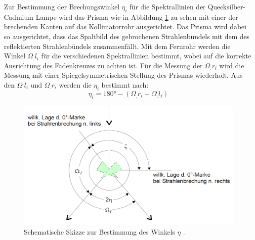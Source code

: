 Zur Bestimmung der Brechungswinkel $\eta_i$ für die Spektrallinien der Quecksilber-Cadmium Lampe wird das Prisma wie in Abbildung \ref{fig:etaMessung} zu sehen mit einer der brechenden Kanten auf das Kollimatorrohr ausgerichtet. Das Prisma wird dabei so ausgerichtet, dass das Spaltbild des gebrochenen Strahlenbündels mit dem des reflektierten Strahlenbündels zusammenfällt. Mit dem Fernrohr werden die Winkel $\Omega_.{l_i}$ für die verschiedenen Spektrallinien bestimmt, wobei auf die korrekte Ausrichtung des Fadenkreuzes zu achten ist. Für die Messung der $\Omega_.{r_i}$ wird die Messung mit einer Spiegelsymmetrischen Stellung des Prismas wiederholt. Aus den $\Omega_.{l_i}$ und $\Omega_.{r_i}$ werden die $\eta_i$ bestimmt nach:
\begin{equation}
\eta_i = 180\si{\degree}-(\Omega_.{r_i}-\Omega_.{l_i}) \label{eq:eta}
\end{equation} 

\begin{figure}
\centering
\includegraphics[width=\linewidth-50pt,height=\textheight-50pt,keepaspectratio]{content/images/etaMessung.png}
\caption{Schematische Skizze zur Bestimmung des Winkels $\eta$ \cite{V402}.}
\label{fig:etaMessung}
\end{figure}

%
 